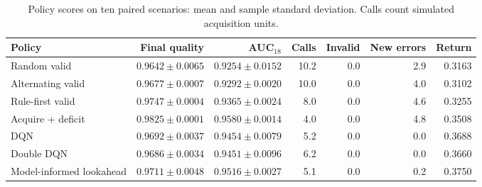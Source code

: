 \begin{table}[t]
\centering
\caption{Policy scores on ten paired scenarios: mean and sample standard deviation. Calls count simulated acquisition units.}
\label{tab:rl_ablation}
\footnotesize
\setlength{\tabcolsep}{3pt}
\begin{tabular*}{\textwidth}{@{\extracolsep{\fill}}lrrrrrr@{}}
\toprule
Policy & Final quality & AUC$_{18}$ & Calls & Invalid & New errors & Return \\
\midrule
Random valid & $0.9642\pm0.0065$ & $0.9254\pm0.0152$ & 10.2 & 0.0 & 2.9 & 0.3163 \\
Alternating valid & $0.9677\pm0.0007$ & $0.9292\pm0.0020$ & 10.0 & 0.0 & 4.0 & 0.3102 \\
Rule-first valid & $0.9747\pm0.0004$ & $0.9365\pm0.0024$ & 8.0 & 0.0 & 4.6 & 0.3255 \\
Acquire + deficit & $0.9825\pm0.0001$ & $0.9580\pm0.0014$ & 4.0 & 0.0 & 4.8 & 0.3508 \\
DQN & $0.9692\pm0.0037$ & $0.9454\pm0.0079$ & 5.2 & 0.0 & 0.0 & 0.3688 \\
Double DQN & $0.9686\pm0.0034$ & $0.9451\pm0.0096$ & 6.2 & 0.0 & 0.0 & 0.3660 \\
Model-informed lookahead & $0.9711\pm0.0048$ & $0.9516\pm0.0027$ & 5.1 & 0.0 & 0.2 & 0.3750 \\
\bottomrule
\end{tabular*}
\end{table}
